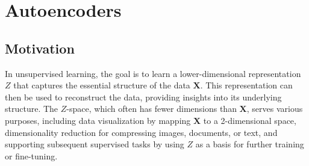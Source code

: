 \documentclass{article}
\begin{document}
\section{Autoencoders} 


\subsection{Motivation}

In unsupervised learning, the goal is to learn a lower-dimensional representation \( Z \) that captures the essential structure of the data \( \mathbf{X} \). This representation can then be used to reconstruct the data, providing insights into its underlying structure. The \( Z \)-space, which often has fewer dimensions than \( \mathbf{X} \), serves various purposes, including data visualization by mapping \( \mathbf{X} \) to a 2-dimensional space, dimensionality reduction for compressing images, documents, or text, and supporting subsequent supervised tasks by using \( Z \) as a basis for further training or fine-tuning.
\end{document}
